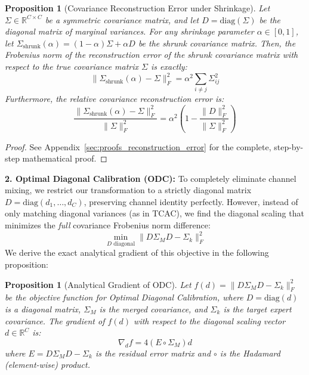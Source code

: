 \documentclass{article}
\theoremstyle{plain}
\newtheorem{proposition}[theorem]{Proposition}
\theoremstyle{definition}
\theoremstyle{remark}
\begin{document}
\begin{proposition}[Covariance Reconstruction Error under Shrinkage]
Let $\Sigma \in \mathbb{R}^{C \times C}$ be a symmetric covariance matrix, and let $D = \text{diag}(\Sigma)$ be the diagonal matrix of marginal variances. For any shrinkage parameter $\alpha \in [0, 1]$, let $\Sigma_{\text{shrunk}}(\alpha) = (1 - \alpha) \Sigma + \alpha D$ be the shrunk covariance matrix. Then, the Frobenius norm of the reconstruction error of the shrunk covariance matrix with respect to the true covariance matrix $\Sigma$ is exactly:
\begin{equation}
  \big\| \Sigma_{\text{shrunk}}(\alpha) - \Sigma \big\|_F^2 = \alpha^2 \sum_{i \neq j} \Sigma_{ij}^2
\end{equation}
Furthermore, the relative covariance reconstruction error is:
\begin{equation}
  \frac{\big\| \Sigma_{\text{shrunk}}(\alpha) - \Sigma \big\|_F^2}{\big\| \Sigma \big\|_F^2} = \alpha^2 \left( 1 - \frac{\big\| D \big\|_F^2}{\big\| \Sigma \big\|_F^2} \right)
\end{equation}
\end{proposition}

\begin{proof}
See Appendix~\ref{sec:proofs_reconstruction_error} for the complete, step-by-step mathematical proof.
\end{proof}

\textbf{2. Optimal Diagonal Calibration (ODC):}
To completely eliminate channel mixing, we restrict our transformation to a strictly diagonal matrix $D = \text{diag}(d_1, \dots, d_C)$, preserving channel identity perfectly. However, instead of only matching diagonal variances (as in TCAC), we find the diagonal scaling that minimizes the \textit{full} covariance Frobenius norm difference:
\begin{equation}
  \min_{D \text{ diagonal}} \| D \Sigma_M D - \Sigma_k \|_F^2
\end{equation}
We derive the exact analytical gradient of this objective in the following proposition:

\begin{proposition}[Analytical Gradient of ODC]
Let $f(d) = \| D \Sigma_M D - \Sigma_k \|_F^2$ be the objective function for Optimal Diagonal Calibration, where $D = \text{diag}(d)$ is a diagonal matrix, $\Sigma_M$ is the merged covariance, and $\Sigma_k$ is the target expert covariance. The gradient of $f(d)$ with respect to the diagonal scaling vector $d \in \mathbb{R}^C$ is:
\begin{equation}
  \nabla_d f = 4 (E \circ \Sigma_M) d
\end{equation}
where $E = D \Sigma_M D - \Sigma_k$ is the residual error matrix and $\circ$ is the Hadamard (element-wise) product.
\end{proposition}
\end{document}

